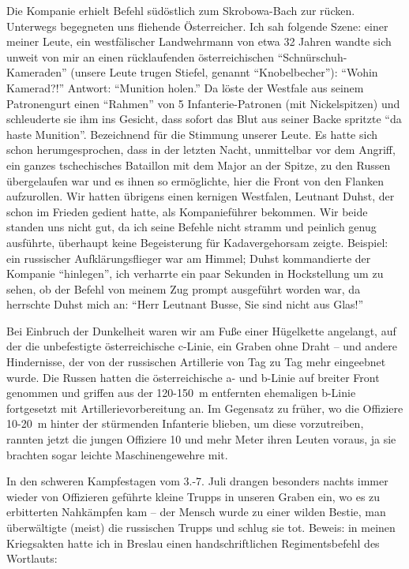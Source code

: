 \documentclass[a5paper,pagesize,10pt,twoside=true]{scrbook}
\begin{document}
Die Kompanie erhielt Befehl südöstlich zum Skrobowa-Bach zur rücken. Unterwegs begegneten uns fliehende Österreicher. Ich sah folgende Szene: einer meiner Leute, ein westfälischer Landwehrmann von etwa 32 Jahren wandte sich unweit von mir an einen rücklaufenden österreichischen \enquote{Schnür\-schuh-Kameraden} (unsere Leute trugen Stiefel, genannt \enquote{Knobelbecher}): \enquote{Wohin Kamerad?!} Antwort: \enquote{Munition holen.} Da löste der Westfale aus seinem Patronengurt einen \enquote{Rahmen} von 5 Infanterie-Patronen (mit Nickelspitzen) und schleuderte sie ihm ins Gesicht, dass sofort das Blut aus seiner Backe spritzte \enquote{da haste Munition}. Bezeichnend für die Stimmung unserer Leute. Es hatte sich schon herumgesprochen, dass in der letzten Nacht, unmittelbar vor dem Angriff, ein ganzes tschechisches Bataillon mit dem Major an der Spitze, zu den Russen übergelaufen war und es ihnen so ermöglichte, hier die Front von den Flanken aufzurollen. Wir hatten übrigens einen kernigen Westfalen, Leutnant Duhst, der schon im Frieden gedient hatte, als Kompanieführer bekommen. Wir beide standen uns nicht gut, da ich seine Befehle nicht stramm und peinlich genug ausführte, überhaupt keine Begeisterung für Kadavergehorsam zeigte. Beispiel: ein russischer Aufklärungsflieger war am Himmel; Duhst kommandierte der Kompanie \enquote{hinlegen}, ich verharrte ein paar Sekunden in Hockstellung um zu sehen, ob der Befehl von meinem Zug prompt ausgeführt worden war, da herrschte Duhst mich an: \enquote{Herr Leutnant Busse, Sie sind nicht aus Glas!}

Bei Einbruch der Dunkelheit waren wir am Fuße einer Hügelkette angelangt, auf der die unbefestigte österreichische c-Linie, ein Graben ohne Draht -- und andere Hindernisse, der von der russischen Artillerie von Tag zu Tag mehr eingeebnet wurde. Die Russen hatten die österreichische a- und b-Linie auf breiter Front genommen und griffen aus der 120-150~m entfernten ehemaligen b-Linie fortgesetzt mit Artillerievorbereitung an. Im Gegensatz zu früher, wo die Offiziere 10-20~m hinter der stürmenden Infanterie blieben, um diese vorzutreiben, rannten jetzt die jungen Offiziere 10 und mehr Meter ihren Leuten voraus, ja sie brachten sogar leichte Maschinengewehre mit.

In den schweren Kampfestagen vom 3.-7. Juli drangen besonders nachts immer wieder von Offizieren geführte kleine Trupps in unseren Graben ein, wo es zu erbitterten Nahkämpfen kam -- der Mensch wurde zu einer wilden Bestie, man überwältigte (meist) die russischen Trupps und schlug sie tot. Beweis: in meinen Kriegsakten hatte ich in Breslau einen handschriftlichen Regimentsbefehl des Wortlauts:
\end{document}
